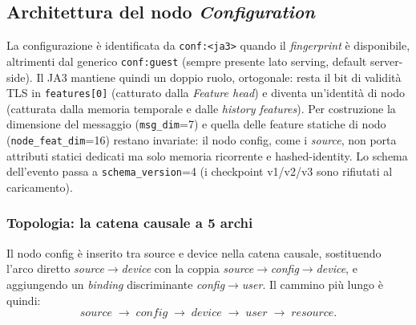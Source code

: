 \subsection{Architettura del nodo \textit{Configuration}}

La configurazione è identificata da \texttt{conf:<ja3>} quando il \emph{fingerprint} è disponibile, altrimenti dal generico \texttt{conf:guest} (sempre presente lato serving, default server-side). Il JA3 mantiene quindi un doppio ruolo, ortogonale: resta il bit di validità TLS in \texttt{features[0]} (catturato dalla \textit{Feature head}) e diventa un'identità di nodo (catturata dalla memoria temporale e dalle \textit{history features}). Per costruzione la dimensione del messaggio (\texttt{msg\_dim}=7) e quella delle feature statiche di nodo (\texttt{node\_feat\_dim}=16) restano invariate: il nodo config, come i \textit{source}, non porta attributi statici dedicati ma solo memoria ricorrente e hashed-identity. Lo schema dell'evento passa a \texttt{schema\_version}=4 (i checkpoint v1/v2/v3 sono rifiutati al caricamento).

\subsubsection{Topologia: la catena causale a 5 archi}

Il nodo config è inserito tra source e device nella catena causale, sostituendo l'arco diretto \textit{source}$\rightarrow$\textit{device} con la coppia \textit{source}$\rightarrow$\textit{config}$\rightarrow$\textit{device}, e aggiungendo un \emph{binding} discriminante \textit{config}$\rightarrow$\textit{user}. Il cammino più lungo è quindi:
\[
\textit{source} \;\rightarrow\; \textit{config} \;\rightarrow\; \textit{device} \;\rightarrow\; \textit{user} \;\rightarrow\; \textit{resource}.
\]

